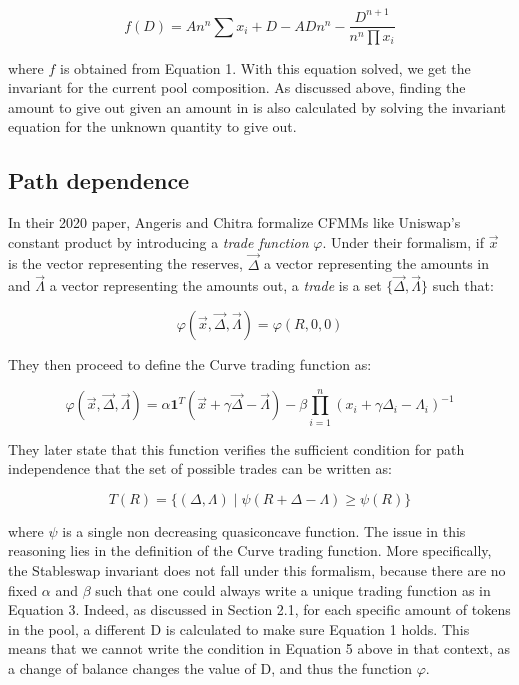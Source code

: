 \documentclass{article}
\begin{document}
    \begin{equation}
        f(D) = A n^{n} \sum x_{i}+D - A D n^{n} -\frac{D^{n+1}}{n^{n} \prod x_{i}}
    \end{equation}

    where $f$ is obtained from Equation 1. With this equation solved, we get the invariant for the current pool composition. As discussed above, finding the amount to give out given an amount in is also calculated by solving the invariant equation for the unknown quantity to give out. 

    \subsection{Path dependence}

    In their 2020 paper, Angeris and Chitra formalize CFMMs like Uniswap's constant product by introducing a \textit{trade function} $\varphi$. Under their formalism, if $\vec{x}$ is the vector representing the reserves, $\vec{\Delta}$ a vector representing the amounts in and $\vec{\Lambda}$ a vector representing the amounts out, a \textit{trade} is a set $\{\vec{\Delta}, \vec{\Lambda}\}$ such that:

    \begin{equation}
        \varphi(\vec{x}, \vec{\Delta}, \vec{\Lambda}) = \varphi(R, 0,0)
    \end{equation}

    They then proceed to define the Curve trading function as: 

    \begin{equation}
        \varphi(\vec{x}, \vec{\Delta}, \vec{\Lambda})=\alpha \mathbf{1}^{T}(\vec{x}+\gamma \vec{\Delta}-\vec{\Lambda})-\beta \prod_{i=1}^{n}\left(x_{i}+\gamma \Delta_{i}-\Lambda_{i}\right)^{-1}
    \end{equation}

    They later state that this function verifies the sufficient condition for path independence that the set of possible trades can be written as: 

    \begin{equation}
        T(R)=\{(\Delta, \Lambda) \mid \psi(R+\Delta-\Lambda) \geq \psi(R)\}
    \end{equation}

    where $\psi$ is a single non decreasing quasiconcave function. The issue in this reasoning lies in the definition of the Curve trading function. More specifically, the Stableswap invariant does not fall under this formalism, because there are no fixed $\alpha$ and $\beta$ such that one could always write a unique trading function as in Equation 3. Indeed, as discussed in Section 2.1, for each specific amount of tokens in the pool, a different D is calculated to make sure Equation 1 holds. This means that we cannot write the condition in Equation 5 above in that context, as a change of balance changes the value of D, and thus the function $\varphi$. 
\end{document}
